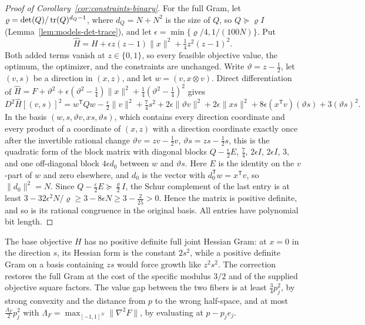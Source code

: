 \begin{proof}[Proof of Corollary~\ref{cor:constraints-binary}]
For the full Gram, let $\varrho=\det(Q)/\operatorname{tr}(Q)^{d_Q-1}$, where $d_Q=N+N^2$ is
the size of $Q$, so $Q\succeq\varrho I$ (Lemma~\ref{lem:models-det-trace}),
and let $\epsilon=\min\{\varrho/4,1/(100N)\}$. Put
\[
 \widehat H=H+\epsilon z(z-1)\|x\|^2+\tfrac14z^2(z-1)^2 .
\]
Both added terms vanish at $z\in\{0,1\}$, so every feasible objective value,
the optimum, the optimizer, and the constraints are unchanged. Write
$\vartheta=z-\frac12$, let $(v,s)$ be a direction in $(x,z)$, and let
$w=(v,x\otimes v)$. Direct differentiation of
$\widehat H=F+\vartheta^2+\epsilon(\vartheta^2-\frac14)\|x\|^2+\frac14(\vartheta^2-\frac14)^2$
gives
\[
 D^2\widehat H[(v,s)]^2=w^{\mathsf T}Qw-\tfrac\epsilon2\|v\|^2+\tfrac74s^2
 +2\epsilon\|\vartheta v\|^2+2\epsilon\|xs\|^2+8\epsilon(x^{\mathsf T}v)(\vartheta s)
 +3(\vartheta s)^2 .
\]
In the basis $(w,s,\vartheta v,xs,\vartheta s)$, which contains every
direction coordinate and every product of a coordinate of $(x,z)$ with a
direction coordinate exactly once after the invertible rational change
$\vartheta v=zv-\frac12v$, $\vartheta s=zs-\frac12s$, this is the quadratic form
of the block matrix with diagonal blocks $Q-\frac\epsilon2E$, $\frac74$,
$2\epsilon I$, $2\epsilon I$, $3$, and one off-diagonal block $4\epsilon d_0$
between $w$ and $\vartheta s$. Here $E$ is the identity on the $v$-part of $w$
and zero elsewhere, and $d_0$ is the vector with $d_0^{\mathsf T}w=x^{\mathsf T}v$,
so $\|d_0\|^2=N$. Since $Q-\frac\epsilon2E\succeq\frac\varrho2I$, the Schur
complement of the last entry is at least
$3-32\epsilon^2N/\varrho\ge3-8\epsilon N\ge3-\frac2{25}>0$. Hence the matrix
is positive definite, and so is its rational congruence in the original basis.
All entries have polynomial bit length.
\end{proof}

The base objective $H$ has no positive definite full joint Hessian Gram: at
$x=0$ in the direction $s$, its Hessian form is the constant $2s^2$, while a
positive definite Gram on a basis containing $zs$ would force growth like
$z^2s^2$. The correction restores the full Gram at the cost of the specific
modulus $3/2$ and of the supplied objective square factors. The value gap
between the two fibers is at least $\frac34p_j^2$, by strong convexity and the
distance from $p$ to the wrong half-space, and at most $\frac{\Lambda_F}2p_j^2$
with $\Lambda_F=\max_{[-1,1]^N}\|\nabla^2F\|$, by evaluating at $p-p_je_j$.
